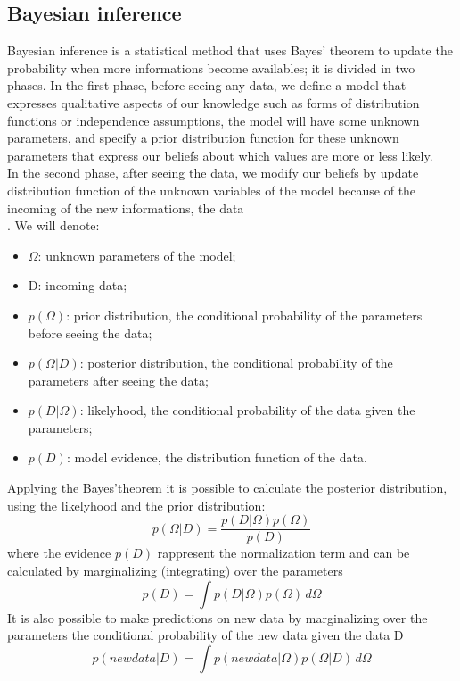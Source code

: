 \subsection{Bayesian inference}
Bayesian inference is a statistical method that uses Bayes' theorem to update the probability when more informations become availables; it is divided in two phases.
In the first phase, before seeing any data, we define a model that expresses qualitative aspects of our knowledge such as forms of distribution functions or independence assumptions, the model will have some unknown parameters, and specify a prior distribution function for these unknown parameters that express our beliefs about which values are more or less likely.\\
In the second phase, after seeing the data, we modify our beliefs by update distribution function of the unknown variables of the model  because of the incoming of the new informations, the data\\.
We will denote:
\begin{itemize}
	\item $\Omega$: unknown parameters of the model;
	\item D: incoming data;
	\item $p(\Omega)$: prior distribution, the conditional probability of the parameters before seeing the data;
	\item $p(\Omega|D)$: posterior distribution, the conditional probability of the parameters after seeing the data;
	\item $p(D|\Omega)$: likelyhood, the conditional probability of the data given the parameters;
	\item $p(D)$: model evidence, the distribution function of the data.	
\end{itemize}
Applying the Bayes'theorem it is possible to calculate the posterior distribution, using the likelyhood and the prior distribution:
$$p(\Omega| D)=\frac{p(D|\Omega)p(\Omega)}{p(D)}$$
where the evidence $p(D)$ rappresent the normalization term and can be calculated by marginalizing (integrating) over the parameters
$$p(D)=\int p(D|\Omega)p(\Omega)\, d\Omega$$
It is also possible to make predictions on new data by marginalizing over the parameters the conditional probability of the new data given the data D 
$$p(new data|D)=\int p(new data|\Omega)p(\Omega|D)\, d\Omega$$

\newpage
